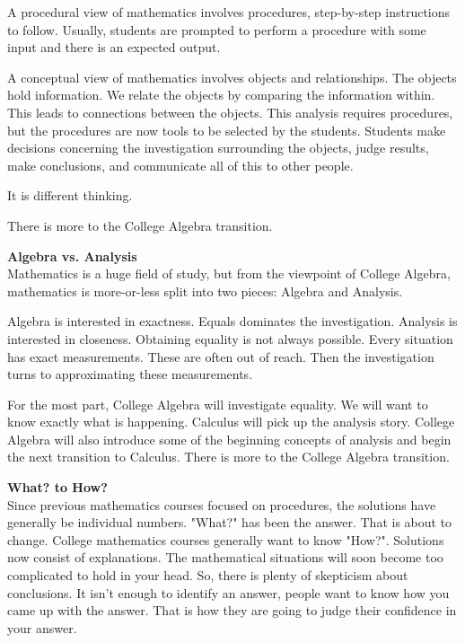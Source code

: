 \documentclass{ximera}
\begin{document}
\begin{idea}
A procedural view of mathematics involves procedures, step-by-step instructions to follow. Usually, students are prompted to perform a procedure with some input and there is an expected output.  

A conceptual view of mathematics involves objects and relationships. The objects hold information. We relate the objects by comparing the information within. This leads to connections between the objects. This analysis requires procedures, but the procedures are now tools to be selected by the students.  Students make decisions concerning the investigation surrounding the objects, judge results, make conclusions, and communicate all of this to other people.

It is different thinking.

\end{idea}





There is more to the College Algebra transition.







\textbf{Algebra vs. Analysis} \\
Mathematics is a huge field of study, but from the viewpoint of College Algebra, mathematics is more-or-less split into two pieces: Algebra and Analysis.

Algebra is interested in exactness.  Equals dominates the investigation. Analysis is interested in closeness.  Obtaining equality is not always possible.  Every situation has exact measurements. These are often out of reach.  Then the investigation turns to approximating these measurements.

For the most part, College Algebra will investigate equality.  We will want to know exactly what is happening. Calculus will pick up the analysis story. College Algebra will also introduce some of the beginning concepts of analysis and begin the next transition to Calculus.
There is more to the College Algebra transition.






\textbf{What? to How?} \\ 
Since previous mathematics courses focused on procedures, the solutions have generally be individual numbers.  "What?" has been the answer.  That is about to change. College mathematics courses generally want to know "How?". Solutions now consist of explanations. 
The mathematical situations will soon become too complicated to hold in your head.  So, there is plenty of skepticism about conclusions. It isn't enough to identify an answer, people want to know how you came up with the answer.  That is how they are going to judge their confidence in your answer.  
\end{document}
